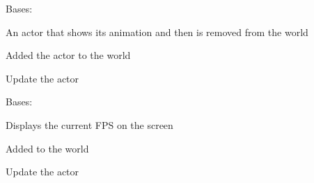 \documentclass[letterpaper,10pt,english]{sphinxmanual}
\begin{document}
\begin{fulllineitems}
\label{blocks:serge.blocks.actors.AnimateThenDieActor}
Bases: {\hyperref[actor:serge.actor.Actor]{}}

An actor that shows its animation and then is removed from the world

\begin{fulllineitems}
\label{blocks:serge.blocks.actors.AnimateThenDieActor.addedToWorld}
Added the actor to the world

\end{fulllineitems}


\begin{fulllineitems}
\label{blocks:serge.blocks.actors.AnimateThenDieActor.updateActor}
Update the actor

\end{fulllineitems}


\end{fulllineitems}


\begin{fulllineitems}
\label{blocks:serge.blocks.actors.FPSDisplay}
Bases: {\hyperref[blocks:serge.blocks.actors.NumericText]{}}

Displays the current FPS on the screen

\begin{fulllineitems}
\label{blocks:serge.blocks.actors.FPSDisplay.addedToWorld}
Added to the world

\end{fulllineitems}


\begin{fulllineitems}
\label{blocks:serge.blocks.actors.FPSDisplay.updateActor}
Update the actor

\end{fulllineitems}


\end{fulllineitems}
\end{document}
